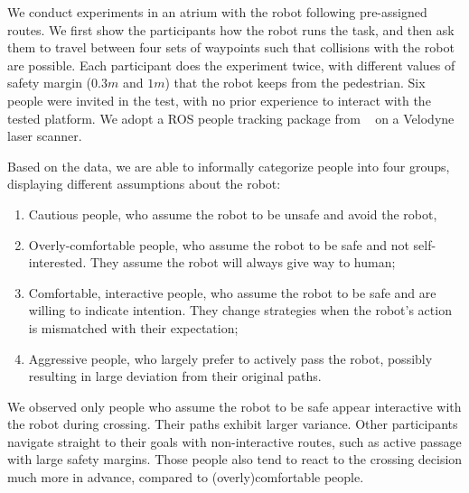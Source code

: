 \documentclass[conference]{IEEEtran}
\begin{document}
We conduct experiments in an atrium with the robot following pre-assigned 
routes. We first show the participants how the robot runs the task, and then 
ask them to travel between four sets of waypoints such that collisions with the 
robot are possible. Each participant does the experiment twice, with different values of 
safety margin ($0.3m$ and $1m$) that the robot keeps from the pedestrian. Six 
people were invited in the test, with no prior experience to interact with the 
tested platform. We adopt a ROS people tracking package from ~\cite{leigh2015person}
on a Velodyne laser scanner.


Based on the data, we are able to informally categorize people into four groups, displaying different assumptions about the 
robot:
\begin{enumerate}
  \item Cautious people, who assume the robot to be unsafe and avoid the robot,
  \item Overly-comfortable people, who assume the robot to be safe and 
    not self-interested. They assume the robot will always give way to human;
  \item Comfortable, interactive people, who assume the robot to be safe and 
    are willing to indicate intention. They change strategies when the robot's 
    action is mismatched with their expectation;
  \item Aggressive people, who largely prefer to actively pass the robot, possibly 
    resulting in large deviation from their original paths.   
\end{enumerate}

We observed only people who assume the 
robot to be safe appear interactive with the robot during crossing. Their paths 
exhibit larger variance. Other participants navigate straight to their goals 
with non-interactive routes, such as active 
passage with large safety margins. Those people also tend to react to the crossing decision 
much more in advance, compared to (overly)comfortable people. 
\end{document}
